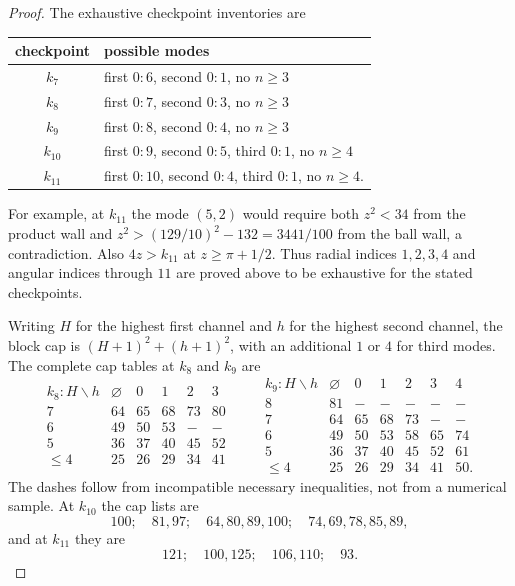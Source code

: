 \documentclass[11pt]{article}
\numberwithin{equation}{section}
\theoremstyle{definition}
\theoremstyle{remark}
\begin{document}
\begin{proof}
The exhaustive checkpoint inventories are
\begin{center}
\small
\begin{tabular}{c|l}
checkpoint&possible modes\\ \hline
\(k_7\)&first \(0{:}6\), second \(0{:}1\), no \(n\geq3\)\\
\(k_8\)&first \(0{:}7\), second \(0{:}3\), no \(n\geq3\)\\
\(k_9\)&first \(0{:}8\), second \(0{:}4\), no \(n\geq3\)\\
\(k_{10}\)&first \(0{:}9\), second \(0{:}5\), third \(0{:}1\), no \(n\geq4\)\\
\(k_{11}\)&first \(0{:}10\), second \(0{:}4\), third \(0{:}1\), no \(n\geq4\).
\end{tabular}
\end{center}
For example, at \(k_{11}\) the mode \((5,2)\) would require both
\(z^2<34\) from the product wall and
\(z^2>(129/10)^2-132=3441/100\) from the ball wall, a contradiction.
Also \(4z>k_{11}\) at \(z\geq\pi+1/2\).  Thus radial indices
\(1,2,3,4\) and angular indices through \(11\) are proved above to be
exhaustive for the stated checkpoints.

Writing \(H\) for the highest first channel and \(h\) for the highest
second channel, the block cap is \((H+1)^2+(h+1)^2\), with an additional
\(1\) or \(4\) for third modes.  The complete cap tables at \(k_8\) and
\(k_9\) are
\[
\begin{array}{c|ccccc}
k_8:H\backslash h&\varnothing&0&1&2&3\\ \hline
7&64&65&68&73&80\\
6&49&50&53&-&-\\
5&36&37&40&45&52\\
\leq4&25&26&29&34&41
\end{array}
\qquad
\begin{array}{c|cccccc}
k_9:H\backslash h&\varnothing&0&1&2&3&4\\ \hline
8&81&-&-&-&-&-\\
7&64&65&68&73&-&-\\
6&49&50&53&58&65&74\\
5&36&37&40&45&52&61\\
\leq4&25&26&29&34&41&50.
\end{array}
\]
The dashes follow from incompatible necessary inequalities, not from a
numerical sample.  At \(k_{10}\) the cap lists are
\[
 100;\quad81,97;\quad64,80,89,100;\quad74,69,78,85,89,
\]
and at \(k_{11}\) they are
\[
 121;\quad100,125;\quad106,110;\quad93.
\]


\end{proof}
\end{document}
